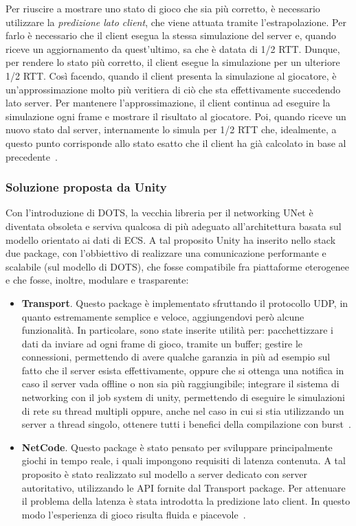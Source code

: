 Per riuscire a mostrare uno stato di gioco che sia più corretto, è necessario utilizzare la \emph{predizione lato client}, che viene attuata tramite l'estrapolazione. Per farlo è necessario che il client esegua la stessa simulazione del server e, quando riceve un aggiornamento da quest'ultimo, sa che è datata di 1/2 RTT. Dunque, per rendere lo stato più corretto, il client esegue la simulazione per un ulteriore 1/2 RTT. Così facendo, quando il client presenta la simulazione al giocatore, è un'approssimazione molto più veritiera di ciò che sta effettivamente succedendo lato server. Per mantenere l'approssimazione, il client continua ad eseguire la simulazione ogni frame e mostrare il risultato al giocatore. Poi, quando riceve un nuovo stato dal server, internamente lo simula per 1/2 RTT che, idealmente, a questo punto corrisponde allo stato esatto che il client ha già calcolato in base al precedente~\cite{book:multiplayergameprogramming}.

\subsubsection{Soluzione proposta da Unity}
Con l'introduzione di DOTS, la vecchia libreria per il networking UNet è diventata obsoleta e serviva qualcosa di più adeguato all'architettura basata sul modello orientato ai dati di ECS. A tal proposito Unity ha inserito nello stack due package, con l'obbiettivo di realizzare una comunicazione performante e scalabile (sul modello di DOTS), che fosse compatibile fra piattaforme eterogenee e che fosse, inoltre, modulare e trasparente:
\begin{itemize}
    \item \textbf{Transport}. Questo package è implementato sfruttando il protocollo UDP, in quanto estremamente semplice e veloce, aggiungendovi però alcune funzionalità. In particolare, sono state inserite utilità per: pacchettizzare i dati da inviare ad ogni frame di gioco, tramite un buffer; gestire le connessioni, permettendo di avere qualche garanzia in più ad esempio sul fatto che il server esista effettivamente, oppure che si ottenga una notifica in caso il server vada offline o non sia più raggiungibile; integrare il sistema di networking con il job system di unity, permettendo di eseguire le simulazioni di rete su thread multipli oppure, anche nel caso in cui si stia utilizzando un server a thread singolo, ottenere tutti i benefici della compilazione con burst~\cite{youtube:unity-transport}.
    \item \textbf{NetCode}. Questo package è stato pensato per sviluppare principalmente giochi in tempo reale, i quali impongono requisiti di latenza contenuta. A tal proposito è stato realizzato sul modello a server dedicato con server autoritativo, utilizzando le API fornite dal Transport package. Per attenuare il problema della latenza è stata introdotta la predizione lato client. In questo modo l'esperienza di gioco risulta fluida e piacevole~\cite{youtube:unity-netcode}.
\end{itemize}

